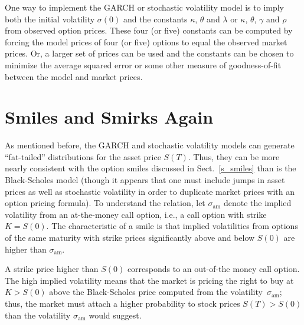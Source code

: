 One way to implement the GARCH or stochastic volatility model is to imply both the initial volatility $\sigma(0)$ and the constants $\kappa$, $\theta$ and $\lambda$ or $\kappa$, $\theta$, $\gamma$ and $\rho$ from observed option prices.  These four (or five) constants can be computed by forcing the model prices of four (or five) options to equal the observed market prices.  Or, a larger set of prices can be used and the constants can be chosen to minimize the average squared error or some other measure of goodness-of-fit between the model and market prices.

\section{Smiles and Smirks Again}\label{s_smilesagain}

As mentioned before, the GARCH and stochastic volatility models can generate  ``fat-tailed'' distributions for the asset price $S(T)$.  Thus, they can be more nearly consistent with the option smiles discussed in Sect.~\ref{s_smiles} than is the Black-Scholes model (though it appears that one must include jumps in asset prices as well as stochastic volatility in order to duplicate market prices with an option pricing formula).  To understand the relation, let $\sigma_\text{am}$ denote the implied volatility from an at-the-money call option, i.e., a call option with strike $K=S(0)$.  The characteristic of a smile is that implied volatilities from options of the same maturity with strike prices significantly above and below $S(0)$ are higher than $\sigma_\text{am}$.  

A strike price higher than $S(0)$  corresponds to an out-of-the money call option.  The high implied volatility means that the market is pricing the right to buy at $K>S(0)$ above the Black-Scholes price computed from the volatility~$\sigma_\text{am}$; thus, the market must attach a higher probability to stock prices $S(T)>S(0)$ than the  volatility $\sigma_\text{am}$ would suggest.  

